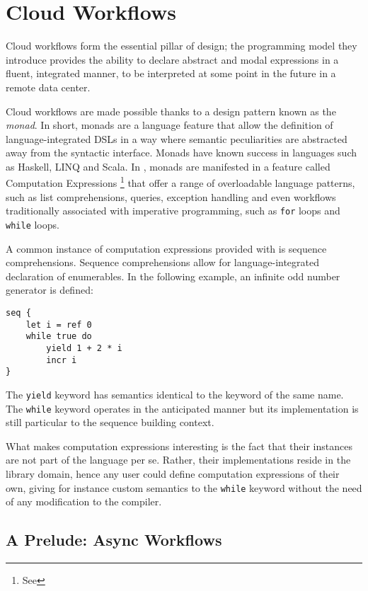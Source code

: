%
%

\section{Cloud Workflows}%
\label{sec:workflows}
%
Cloud workflows form the essential pillar of \mbrace{} design;
the programming model they introduce provides the ability to declare abstract
and modal expressions in a fluent, integrated manner, to be interpreted 
at some point in the future in a remote data center.

Cloud workflows are made possible thanks to a design pattern known as the \emph{monad}.
In short, monads are a language feature that allow the definition of language-integrated 
DSLs in a way where semantic peculiarities are abstracted away from the syntactic interface.
Monads have known success in languages such as Haskell, \csharp{} LINQ and Scala. 
In \fsharp, monads are manifested in a feature called 
Computation Expressions%
\footnote{See }
that offer a range of overloadable language patterns, such as list comprehensions, 
queries, exception handling and even workflows traditionally associated with 
imperative programming, such as \texttt{for} loops and \texttt{while} loops.

A common instance of computation expressions provided with \fsharp{} is 
sequence comprehensions. Sequence comprehensions allow for language-integrated declaration 
of \dotnet{} enumerables. In the following example, an infinite odd number generator is 
defined:
\begin{lstlisting}
seq {
	let i = ref 0
	while true do
		yield 1 + 2 * i
		incr i
}
\end{lstlisting}
The \texttt{yield} keyword has semantics identical to the \csharp{} keyword of the same 
name. The \texttt{while} keyword operates in the anticipated manner but its implementation
is still particular to the sequence building context.

What makes computation expressions interesting is the fact that their instances
are not part of the \fsharp{} language per se. Rather, their implementations
reside in the library domain, hence any user could define computation expressions
of their own, giving for instance custom semantics to the \texttt{while} keyword 
without the need of any modification to the compiler\cite{fsharp-compexpr}.

\subsection{A Prelude: \fsharp{} Async Workflows}

